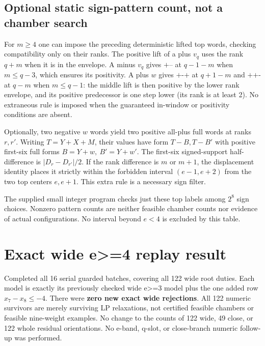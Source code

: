 \documentclass[
  11pt,
]{article}
\begin{document}
\subsection{Optional static sign-pattern count, not a chamber
search}\label{optional-static-sign-pattern-count-not-a-chamber-search}

For \(m\ge4\) one can impose the preceding deterministic lifted top
words, checking compatibility only on their ranks. The positive lift of
a plus \(v_q\) uses the rank \(q+m\) when it is in the envelope. A minus
\(v_q\) gives \(\texttt{+--}\) at \(q-1-m\) when \(m\le q-3\), which
ensures its positivity. A plus \(w\) gives \(\texttt{+-+}\) at \(q+1-m\)
and \(\texttt{++-}\) at \(q-m\) when \(m\le q-1\): the middle lift is
then positive by the lower rank envelope, and its positive predecessor
is one step lower (its rank is at least 2). No extraneous rule is
imposed when the guaranteed in-window or positivity conditions are
absent.

Optionally, two negative \(w\) words yield two positive all-plus full
words at ranks \(r,r'\). Writing \(T=Y+X+M\), their values have form
\(T-B,T-B'\) with positive first-six full forms \(B=Y+w,\ B'=Y+w'\). The
first-six signed-support half-difference is \(|D_r-D_{r'}|/2\). If the
rank difference is \(m\) or \(m+1\), the displacement identity places it
strictly within the forbidden interval \((e-1,e+2)\) from the two top
centers \(e,e+1\). This extra rule is a necessary sign filter.

The supplied small integer program checks just these top labels among
\(2^8\) sign choices. Nonzero pattern counts are neither feasible
chamber counts nor evidence of actual configurations. No interval beyond
\(e<4\) is excluded by this table.

\section{Exact wide e\textgreater=4 replay
result}\label{exact-wide-e4-replay-result}

Completed all 16 serial guarded batches, covering all 122 wide root
duties. Each model is exactly its previously checked wide
e\textgreater=3 model plus the one added row \(x_7-x_8\le-4\). There
were \textbf{zero new exact wide rejections}. All 122 numeric survivors
are merely surviving LP relaxations, not certified feasible chambers or
feasible nine-weight examples. No change to the counts of 122 wide, 49
close, or 122 whole residual orientations. No e-band, q-slot, or
close-branch numeric follow-up was performed.
\end{document}
